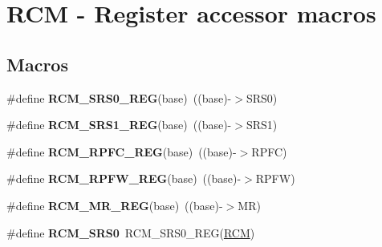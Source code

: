 \hypertarget{group__RCM__Register__Accessor__Macros}{}\section{R\+CM -\/ Register accessor macros}
\label{group__RCM__Register__Accessor__Macros}
\subsection*{Macros}
\begin{DoxyCompactItemize}
\item 
\#define {\bfseries R\+C\+M\+\_\+\+S\+R\+S0\+\_\+\+R\+EG}(base)~((base)-\/$>$S\+R\+S0)\hypertarget{group__RCM__Register__Accessor__Macros_gab75f78e13fd4a015cada6728b29c681c}{}\label{group__RCM__Register__Accessor__Macros_gab75f78e13fd4a015cada6728b29c681c}

\item 
\#define {\bfseries R\+C\+M\+\_\+\+S\+R\+S1\+\_\+\+R\+EG}(base)~((base)-\/$>$S\+R\+S1)\hypertarget{group__RCM__Register__Accessor__Macros_ga6b4794a4c891e1ede19dc7a446870489}{}\label{group__RCM__Register__Accessor__Macros_ga6b4794a4c891e1ede19dc7a446870489}

\item 
\#define {\bfseries R\+C\+M\+\_\+\+R\+P\+F\+C\+\_\+\+R\+EG}(base)~((base)-\/$>$R\+P\+FC)\hypertarget{group__RCM__Register__Accessor__Macros_ga361aa484c058d992d93d6f61316029f3}{}\label{group__RCM__Register__Accessor__Macros_ga361aa484c058d992d93d6f61316029f3}

\item 
\#define {\bfseries R\+C\+M\+\_\+\+R\+P\+F\+W\+\_\+\+R\+EG}(base)~((base)-\/$>$R\+P\+FW)\hypertarget{group__RCM__Register__Accessor__Macros_ga0be970e23a295c11f2e80b9f83ae4dbe}{}\label{group__RCM__Register__Accessor__Macros_ga0be970e23a295c11f2e80b9f83ae4dbe}

\item 
\#define {\bfseries R\+C\+M\+\_\+\+M\+R\+\_\+\+R\+EG}(base)~((base)-\/$>$MR)\hypertarget{group__RCM__Register__Accessor__Macros_ga9f44c7b140bd2f4cf7b9452299bc8a73}{}\label{group__RCM__Register__Accessor__Macros_ga9f44c7b140bd2f4cf7b9452299bc8a73}

\item 
\#define {\bfseries R\+C\+M\+\_\+\+S\+R\+S0}~R\+C\+M\+\_\+\+S\+R\+S0\+\_\+\+R\+EG(\hyperlink{group__RCM__Peripheral__Access__Layer_gaa5c5e6af3b266654facbd52caa0b8874}{R\+CM})\hypertarget{group__RCM__Register__Accessor__Macros_gaae0200bfd0eb1d7f7fd0d142c21fe92a}{}\label{group__RCM__Register__Accessor__Macros_gaae0200bfd0eb1d7f7fd0d142c21fe92a}


\end{DoxyCompactItemize}
